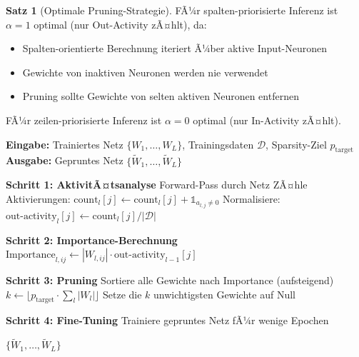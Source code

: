﻿\documentclass[a4paper,12pt]{report}
\theoremstyle{definition}
\newtheorem{satz}{Satz}
\begin{document}
	\begin{satz}[Optimale Pruning-Strategie]
		FÃ¼r spalten-priorisierte Inferenz ist $\alpha = 1$ optimal (nur Out-Activity zÃ¤hlt), da:
		\begin{itemize}
			\item Spalten-orientierte Berechnung iteriert Ã¼ber aktive Input-Neuronen
			\item Gewichte von inaktiven Neuronen werden nie verwendet
			\item Pruning sollte Gewichte von selten aktiven Neuronen entfernen
		\end{itemize}
		
		FÃ¼r zeilen-priorisierte Inferenz ist $\alpha = 0$ optimal (nur In-Activity zÃ¤hlt).
	\end{satz}
	
	\begin{algorithm}[H]
		\caption{Asymmetrie-bewusstes Structured Pruning}
		\label{alg:asymmetry-aware-pruning}
		\textbf{Eingabe:} Trainiertes Netz $\{W_1, \ldots, W_L\}$, Trainingsdaten $\mathcal{D}$, Sparsity-Ziel $p_{\text{target}}$ \\
		\textbf{Ausgabe:} Gepruntes Netz $\{\tilde{W}_1, \ldots, \tilde{W}_L\}$
		\begin{algorithmic}[1]
			\State \textbf{Schritt 1: AktivitÃ¤tsanalyse}
			\State Forward-Pass durch Netz
			\State ZÃ¤hle Aktivierungen: $\text{count}_l[j] \gets \text{count}_l[j] + \mathbb{1}_{a_{l,j} \neq 0}$
			\EndFor
			\EndFor
			\State Normalisiere: $\text{out-activity}_l[j] \gets \text{count}_l[j] / |\mathcal{D}|$
			
			\State \textbf{Schritt 2: Importance-Berechnung}
			\State $\text{Importance}_{l,ij} \gets |W_{l,ij}| \cdot \text{out-activity}_{l-1}[j]$
			\EndFor
			\EndFor
			
			\State \textbf{Schritt 3: Pruning}
			\State Sortiere alle Gewichte nach Importance (aufsteigend)
			\State $k \gets \lfloor p_{\text{target}} \cdot \sum_l |W_l| \rfloor$
			\State Setze die $k$ unwichtigsten Gewichte auf Null
			
			\State \textbf{Schritt 4: Fine-Tuning}
			\State Trainiere gepruntes Netz fÃ¼r wenige Epochen
			
			\State \Return $\{\tilde{W}_1, \ldots, \tilde{W}_L\}$
		\end{algorithmic}
	\end{algorithm}
	
\end{document}
